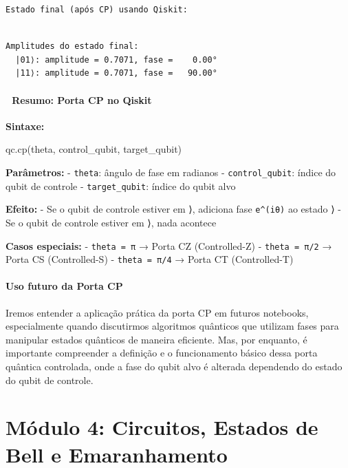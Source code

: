 \documentclass[
  brazilian,
]{report}
\newenvironment{Shaded}{\begin{snugshade}}{\end{snugshade}}
\newcommand{\NormalTok}[1]{\textcolor[rgb]{0.00,0.23,0.31}{#1}}
\begin{document}
\begin{verbatim}
Estado final (após CP) usando Qiskit:
\end{verbatim}

\begin{verbatim}

Amplitudes do estado final:
  |01⟩: amplitude = 0.7071, fase =    0.00°
  |11⟩: amplitude = 0.7071, fase =   90.00°
\end{verbatim}

\subsubsection{📝 Resumo: Porta CP no
Qiskit}\label{resumo-porta-cp-no-qiskit}

\textbf{Sintaxe:}

\begin{Shaded}
\begin{Highlighting}[]
\NormalTok{qc.cp(theta, control\_qubit, target\_qubit)}
\end{Highlighting}
\end{Shaded}

\textbf{Parâmetros:} - \texttt{theta}: ângulo de fase em radianos -
\texttt{control\_qubit}: índice do qubit de controle -
\texttt{target\_qubit}: índice do qubit alvo

\textbf{Efeito:} - Se o qubit de controle estiver em ⟩,
adiciona fase \texttt{e\^{}(iθ)} ao estado ⟩ - Se o qubit de
controle estiver em ⟩, nada acontece

\textbf{Casos especiais:} - \texttt{theta\ =\ π} → Porta CZ
(Controlled-Z) - \texttt{theta\ =\ π/2} → Porta CS (Controlled-S) -
\texttt{theta\ =\ π/4} → Porta CT (Controlled-T)

\subsubsection{Uso futuro da Porta CP}\label{uso-futuro-da-porta-cp}

Iremos entender a aplicação prática da porta CP em futuros notebooks,
especialmente quando discutirmos algoritmos quânticos que utilizam fases
para manipular estados quânticos de maneira eficiente. Mas, por
enquanto, é importante compreender a definição e o funcionamento básico
dessa porta quântica controlada, onde a fase do qubit alvo é alterada
dependendo do estado do qubit de controle.

\newpage

\chapter{Módulo 4: Circuitos, Estados de Bell e
Emaranhamento}\label{muxf3dulo-4-circuitos-estados-de-bell-e-emaranhamento}
\end{document}
